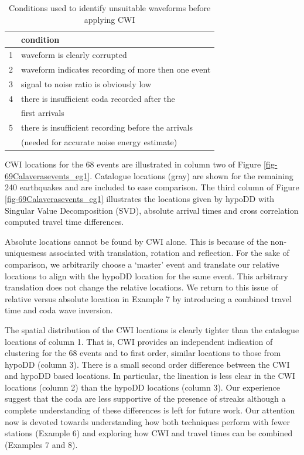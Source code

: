 \documentclass[extra, onecolumn, doublespacing]{gji}
\begin{document}
\begin{table}
\caption[Conditions for identifying unsuitable waveforms when
applying CWI] {Conditions used to identify unsuitable waveforms
before applying CWI \citep[Originally published as Table
5][]{dr_Robinson11a}} \label{tab:-conditions4unsuitablewaveform}
\begin{tabular}{|l|p{}|}
\hline
 & \textbf{condition} \\
\hline
1 & waveform is clearly corrupted \\
2 & waveform indicates recording of more then one event \\
3 & signal to noise ratio is obviously low \\
4 & there is insufficient coda recorded after the \\
 & first arrivals \\
5 & there is insufficient recording before the arrivals \\
 &  (needed for accurate noise energy estimate) \\
\hline
\end{tabular}
\end{table}

CWI locations for the 68 events are illustrated in column two of
Figure \ref{fig-69Calaverasevents_eg1}. Catalogue locations (gray)
are shown for the remaining 240 earthquakes and are included to ease
comparison. The third column of Figure
\ref{fig-69Calaverasevents_eg1} illustrates the locations given by
hypoDD with Singular Value Decomposition (SVD), absolute arrival
times and cross correlation computed travel time differences.

Absolute locations cannot be found by CWI alone. This is because of
the non-uniquesness associated with translation, rotation and
reflection. For the sake of comparison, we arbitrarily choose a
`master' event and translate our relative locations to align with
the hypoDD location for the same event. This arbitrary translation
does not change the relative locations. We return to this issue of
relative versus absolute location in Example 7 by introducing a
combined travel time and coda wave inversion.

The spatial distribution of the CWI locations is clearly tighter
than the catalogue locations of column 1. That is, CWI provides an
independent indication of clustering for the 68 events and to first
order, similar locations to those from hypoDD (column 3). There is a
small second order difference between the CWI and hypoDD based
locations. In particular, the lineation is less clear in the CWI
locations (column 2) than the hypoDD locations (column 3). Our
experience suggest that the coda are less supportive of the presence of
streaks although a complete understanding of these differences is
left for future work. Our attention now is devoted towards
understanding how both techniques perform with fewer stations
(Example 6) and exploring how CWI and travel times can be combined
(Examples 7 and 8).
\end{document}
